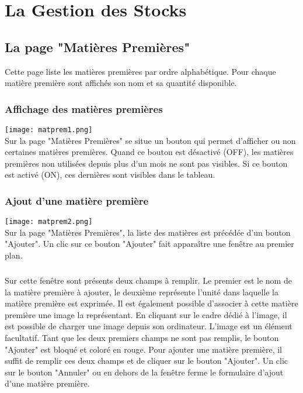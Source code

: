 \chapter{La Gestion des Stocks}

\section{La page "Matières Premières"}
Cette page liste les matières premières par ordre alphabétique. Pour chaque 
matière première sont affichés son nom et sa quantité disponible.

\subsection{Affichage des matières premières}

\texttt{[image: matprem1.png]}\\

Sur la page "Matières Premières" se situe un bouton qui permet d'afficher ou non 
certaines matières premières. Quand ce bouton est désactivé (OFF), les matières 
premières non utilisées depuis plus d'un mois ne sont pas visibles. Si ce bouton
 est activé (ON), ces dernières sont visibles dans le tableau.


\subsection{Ajout d'une matière première}
\texttt{[image: matprem2.png]}\\
Sur la page "Matières Premières", la liste des matières est précédée d'un bouton
 "Ajouter". 
Un clic sur ce bouton "Ajouter" fait apparaître une fenêtre au premier plan. 

\paragraph{}
Sur cette fenêtre sont présents deux champs à remplir. Le premier est le nom de 
la matière première à ajouter, le deuxième représente l'unité dans laquelle la 
matière première est exprimée. Il est également possible d'associer à cette 
matière première une image la représentant. En cliquant sur le cadre dédié à 
l'image, il est possible de charger une image depuis son ordinateur. L'image est
un élément facultatif. Tant que les deux premiers champs ne sont pas remplis, 
le bouton "Ajouter" est bloqué et coloré en rouge. Pour ajouter une matière 
première, il suffit de remplir ces deux champs et de cliquer sur le bouton 
"Ajouter". Un clic sur le bouton "Annuler" ou en dehors de la fenêtre ferme 
le formulaire d'ajout d'une matière première.


